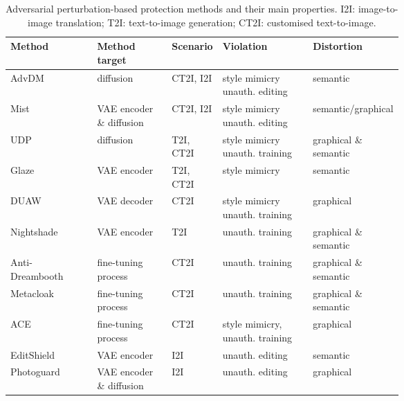
\begin{table*}
    \centering
\caption{Adversarial perturbation-based protection methods and their main properties. I2I: image-to-image translation; T2I: text-to-image generation; CT2I: customised text-to-image.}
\label{tab:adversarial-perturbations}
    \begin{tabular}{l|>{\raggedright\arraybackslash}p{0.19\linewidth}>{\raggedright\arraybackslash}p{0.08\linewidth}>{\raggedright\arraybackslash}p{0.23\linewidth}>{\raggedright\arraybackslash}p{0.16\linewidth}}
 \toprule
 \textbf{Method}& \textbf{Method target}& \textbf{Scenario} & \textbf{Violation} & \textbf{Distortion}\\
 \midrule
         AdvDM~\cite{liang_adversarial_2023}&  diffusion&  CT2I, I2I &  style mimicry
unauth. editing & semantic\\
         Mist~\cite{liang_mist_2023}&  VAE encoder \& diffusion&  CT2I, I2I &  style mimicry
unauth. editing& semantic/graphical \\
         UDP~\cite{zhao_unlearnable_2023}&  diffusion& T2I, CT2I &  style mimicry
unauth. training&graphical \& semantic\\
         Glaze~\cite{shan_glaze_2023}&  VAE encoder& T2I, CT2I &  style mimicry& semantic\\
         DUAW~\cite{ye_duaw_2023}&  VAE decoder& CT2I &  style mimicry
unauth. training& graphical\\
Nightshade~\cite{shan_prompt-specific_2023} & VAE encoder & T2I & unauth. training   & graphical \& semantic \\
 Anti-Dreambooth~\cite{van_le_anti-dreambooth_2023} & fine-tuning process & CT2I & unauth. training & graphical \& semantic\\ 
 Metacloak~\cite{liu_metacloak_2024} & fine-tuning process & CT2I & unauth. training & graphical \& semantic\\
 ACE~\cite{zheng_understanding_2023} & fine-tuning process & CT2I & style mimicry, unauth. training & graphical\\
 EditShield~\cite{chen_editshield_2023}&  VAE encoder&  I2I&  unauth. editing& semantic\\
 Photoguard~\cite{salman_raising_2023}& VAE encoder \& diffusion& I2I& unauth. editing& graphical\\
 \bottomrule
    \end{tabular}
    
    
\end{table*}